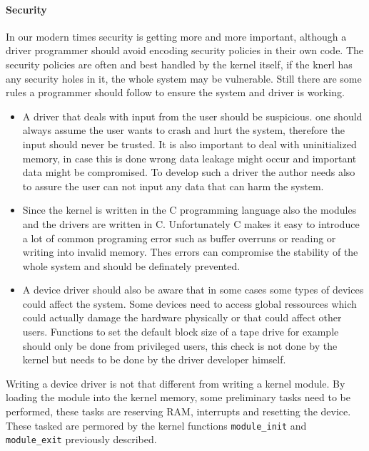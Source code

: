 \documentclass{sig-alternate-05-2015}
\begin{document}
\paragraph{Security}
In our modern times security is getting more and more important, although a driver programmer should avoid encoding security policies in their own code. The security policies are often and best handled by the kernel itself, if the knerl has any security holes in it, the whole system may be vulnerable. Still there are some rules a programmer should follow to ensure the system and driver is working.
\begin{itemize}
\item A driver that deals with input from the user should be suspicious. one should always assume the user wants to crash and hurt the system, therefore the input should never be trusted. It is also important to deal with uninitialized memory, in case this is done wrong data leakage might occur and important data might be compromised. To develop such a driver the author needs also to assure the user can not input any data that can harm the system.
\item Since the kernel is written in the C programming language also the modules and the drivers are written in C. Unfortunately C makes it easy to introduce a lot of common programing error such as buffer overruns or reading or writing into invalid memory. Thes errors can compromise the stability of the whole system and should be definately prevented.
\item A device driver should also be aware that in some cases some types of devices could affect the system. Some devices need to access global ressources which could actually damage the hardware physically or that could affect other users. Functions to set the default block size of a tape drive for example should only be done from privileged users, this check is not done by the kernel but needs to be done by the driver developer himself.
\end{itemize}

Writing a device driver is not that different from writing a kernel module. By loading the module into the kernel memory, some preliminary tasks need to be performed, these tasks are reserving RAM, interrupts and resetting the device. These tasked are permored by the kernel functions \texttt{module\_init} and \texttt{module\_exit} previously described. 
\end{document}
